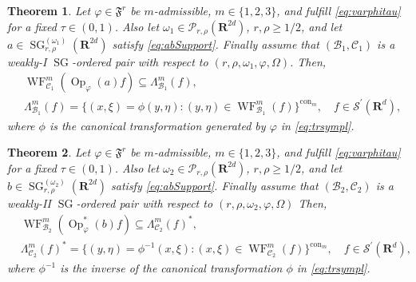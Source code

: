 \documentclass[12pt,a4paper,reqno]{amsart}
\numberwithin{equation}{section}
\newtheorem{thm}{Theorem}
\numberwithin{thm}{section}
\theoremstyle{definition}
\theoremstyle{remark}
\begin{document}
\begin{thm}
\label{thm:3.23}
Let $\varphi \in {\mathfrak{F}^r}$ be $m$-admissible, $m\in\{1,2,3\}$, and fulfill \eqref{eq:varphitau}
for a fixed $\tau \in (0,1)$.
Also let $\omega _1\in \mathscr P_{r,\rho}({\mathbf R^{{2d}}})$, $r,\rho \ge 1/2$, and
let $a\in{\operatorname{SG}}^{(\omega _1)}_{r,\rho}({\mathbf R^{{2d}}})$
satisfy \eqref{eq:abSupport}.
Finally assume that 
$({{\mathcal B}}_1,{{\mathcal C}}_1)$ is a weakly-I ${\operatorname{SG}}$-ordered pair with respect to
$(r,\rho ,\omega _1,\varphi ,\Omega )$.
Then,
\begin{equation}
\label{eq:wfincl}
\begin{aligned}
&{\operatorname{WF}}^{m}_{{{\mathcal C}}_1}({\operatorname{Op}}_\varphi(a)f) \subseteq \Lambda^m_{{{\mathcal B}}_1}(f),
\\
&\Lambda^m_{{{\mathcal B}}_1}(f)=\{(x,\xi)=\phi(y,\eta)
\colon (y,\eta)\in{\operatorname{WF}}^{m}_{{{\mathcal B}}_1}(f)\}^{\mathrm{con}_m},\quad
f \in {{\mathscr S}}^\prime({\mathbf R^{{d}}}),
\end{aligned}
\end{equation}
where $\phi$ is the canonical transformation generated by $\varphi$
in \eqref{eq:trsympl}.
\end{thm}

\par

\begin{thm}
\label{thm:3.23bis}
Let $\varphi \in {\mathfrak{F}^r}$ be $m$-admissible, $m\in\{1,2,3\}$, and fulfill \eqref{eq:varphitau}
for a fixed $\tau \in (0,1)$.
Also let $\omega_2\in \mathscr P_{r,\rho}({\mathbf R^{{2d}}})$, $r,\rho \ge 1/2$, and
let $b\in{\operatorname{SG}}^{(\omega_2)}_{r,\rho}({\mathbf R^{{2d}}})$
satisfy \eqref{eq:abSupport}.
Finally assume that
$({{\mathcal B}}_2,{{\mathcal C}}_2)$ is a weakly-II ${\operatorname{SG}}$-ordered pair with respect to
$(r,\rho ,\omega _2,\varphi ,\Omega )$
Then,
\begin{equation}
\label{eq:wfinclbis}
\begin{aligned}
&{\operatorname{WF}}^{m}_{{{\mathcal B}}_2}({\operatorname{Op}}_\varphi^*(b)f) \subseteq \Lambda^{m}_{{{\mathcal C}}_2}(f)^*,
\\
&\Lambda^{m}_{{{\mathcal C}}_2}(f)^*=\{(y,\eta)=\phi^{-1}(x,\xi)\colon(x,\xi)
\in{\operatorname{WF}}^{m}_{{{\mathcal C}}_2}(f)\}^{\mathrm{con}_m},\quad
f \in {{\mathscr S}}^\prime({\mathbf R^{{d}}}),
\end{aligned}
\end{equation}
where $\phi^{-1}$ is the inverse of the canonical transformation $\phi$
in \eqref{eq:trsympl}.
\end{thm}
\end{document}
